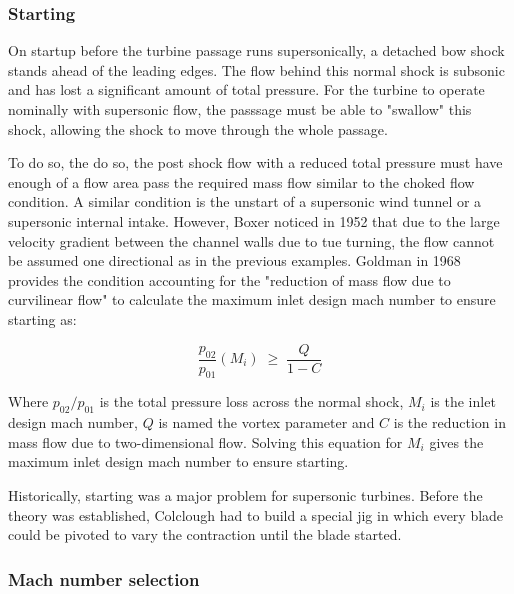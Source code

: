 
\subsubsection{Starting}

On startup before the turbine passage runs supersonically, a detached bow shock stands ahead of the leading edges. The flow behind this normal shock is subsonic and has lost a significant amount of total pressure. For the turbine to operate nominally with supersonic flow, the passsage must be able to "swallow" this shock, allowing the shock to move through the whole passage.

To do so, the do so, the post shock flow with a reduced total pressure must have enough of a flow area pass the required mass flow similar to the choked flow condition. A similar condition is the unstart of a supersonic wind tunnel or a supersonic internal intake. However, Boxer noticed in 1952 that due to the large velocity gradient between the channel walls due to tue turning, the flow cannot be assumed one directional as in the previous examples. Goldman in 1968 provides the condition accounting for the "reduction of mass flow due to curvilinear flow" to calculate the maximum inlet design mach number to ensure starting as:

\begin{equation}
\frac{p_{02}}{p_{01}}(M_i) \;\geq\; \frac{Q}{1-C}
\end{equation}

Where $p_{02}/p_{01}$ is the total pressure loss across the normal shock, $M_i$ is the inlet design mach number, $Q$ is named the vortex parameter \cite{sudhof} and $C$ is the reduction in mass flow due to two-dimensional flow. Solving this equation for $M_i$ gives the maximum inlet design mach number to ensure starting. 

Historically, starting was a major problem for supersonic turbines. Before the theory was established, Colclough had to build a special jig in which every blade could be pivoted to vary the contraction until the blade started.

\subsubsection{Mach number selection}

